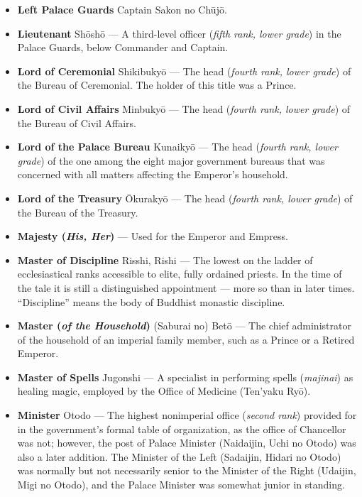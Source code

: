 \documentclass{article}
\begin{document}
\begin{multicols}{2}
\begin{small}
\begin{itemize}[
				label=,
				leftmargin=0em,
				rightmargin=-1.5em,
				itemindent=-2em,
			]
			\item \textbf{Left Palace Guards} Captain Sakon no Chūjō.

			\item \textbf{Lieutenant} Shōshō --- A third-level officer (\textit{fifth rank, lower grade}) in the Palace Guards, below Commander and Captain.

			\item \textbf{Lord of Ceremonial} Shikibukyō --- The head (\textit{fourth rank, lower grade}) of the Bureau of Ceremonial. The holder of this title was a Prince.

			\item \textbf{Lord of Civil Affairs} Minbukyō --- The head (\textit{fourth rank, lower grade}) of the Bureau of Civil Affairs.

			\item \textbf{Lord of the Palace Bureau} Kunaikyō --- The head (\textit{fourth rank, lower grade}) of the one among the eight major government bureaus that was concerned with all matters affecting the Emperor's household.

			\item \textbf{Lord of the Treasury} Ōkurakyō --- The head (\textit{fourth rank, lower grade}) of the Bureau of the Treasury.

			\item \textbf{Majesty (\textit{His, Her})} --- Used for the Emperor and Empress.

			\item \textbf{Master of Discipline} Risshi, Rishi --- The lowest on the ladder of ecclesiastical ranks accessible to elite, fully ordained priests. In the time of the tale it is still a distinguished appointment --- more so than in later times. “Discipline” means the body of Buddhist monastic discipline.

			\item \textbf{Master (\textit{of the Household})} (Saburai no) Betō --- The chief administrator of the household of an imperial family member, such as a Prince or a Retired Emperor.

			\item \textbf{Master of Spells} Jugonshi --- A specialist in performing spells (\textit{majinai}) as healing magic, employed by the Office of Medicine (Ten'yaku Ryō).

			\item \textbf{Minister} Otodo --- The highest nonimperial office (\textit{second rank}) provided for in the government's formal table of organization, as the office of Chancellor was not; however, the post of Palace Minister (Naidaijin, Uchi no Otodo) was also a later addition. The Minister of the Left (Sadaijin, Hidari no Otodo) was normally but not necessarily senior to the Minister of the Right (Udaijin, Migi no Otodo), and the Palace Minister was somewhat junior in standing.


\end{itemize}
\end{small}
\end{multicols}
\end{document}
